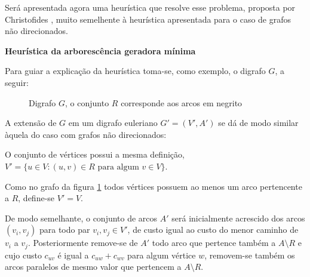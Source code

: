         Será apresentada agora uma heurística que resolve esse problema, proposta por Christofides \cite{christofides-86}, muito semelhente à heurística apresentada para o caso de grafos não direcionados.

        \textbf{Heurística da arborescência geradora mínima}

        Para guiar a explicação da heurística toma-se, como exemplo, o digrafo $G$, a seguir:
   

        \begin{figure}[H]
            \centering
            \caption{Digrafo $G$, o conjunto $R$ corresponde aos arcos em negrito}
            \label{pcr-digraph}
        \end{figure}

        A extensão de $G$ em um digrafo euleriano $G' = (V', A')$ se dá de modo similar àquela do caso com grafos não direcionados:

        O conjunto de vértices possui a mesma definição, $V' = \{u \in V : (u, v) \in R \text{ para algum } v \in V\}$. 

        Como no grafo da figura \ref{pcr-digraph} todos vértices possuem ao menos um arco pertencente a $R$, define-se $V' = V$.

        De modo semelhante, o conjunto de arcos $A'$ será inicialmente acrescido dos arcos $(v_i, v_j)$ para todo par $v_i, v_j \in V'$, de custo igual ao custo do menor caminho de $v_i$ a $v_j$.
        Posteriormente remove-se de $A'$ todo arco que pertence também a $A \setminus R$ e cujo custo $c_{uv}$ é igual a $c_{uw} + c_{wv}$ para algum vértice $w$, removem-se também os arcos paralelos de mesmo valor que pertencem a $A \setminus R$.

